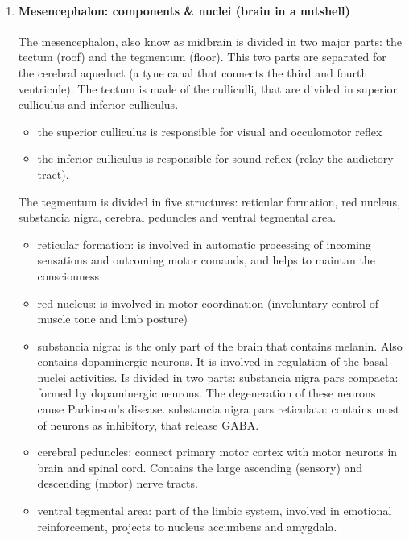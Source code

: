 \documentclass[12pt,article,oneside,a4paper]{memoir}
\begin{document}
\begin{enumerate}
\item \paragraph{Mesencephalon: components \& nuclei (brain in a nutshell)}\label{question:mesencephalon}
The mesencephalon, also know as midbrain is divided in two major parts: the tectum (roof) and the tegmentum (floor). This two parts are separated for the cerebral aqueduct (a tyne canal that connects the third and fourth ventricule).
The tectum is made of the culliculli, that are divided in superior culliculus and inferior culliculus.
\begin{itemize}
\item the superior culliculus is responsible for visual and occulomotor reflex 
\item the inferior culliculus is responsible for sound reflex (relay the audictory tract).
\end{itemize}
The tegmentum is divided in five structures: reticular formation, red nucleus, substancia nigra, cerebral peduncles and ventral tegmental area.
\begin{itemize}
\item reticular formation: is involved in automatic processing of incoming sensations and outcoming motor comands, and helps to maintan the consciouness
\item red nucleus: is involved in motor coordination (involuntary control of muscle tone and limb posture)
\item substancia nigra: is the only part of the brain that contains melanin. Also contains dopaminergic neurons. It is involved in regulation of the basal nuclei activities. Is divided in two parts:
\subitem substancia nigra pars compacta: formed by dopaminergic neurons. The degeneration of these neurons cause Parkinson's disease.
\subitem substancia nigra pars reticulata: contains most of neurons as inhibitory, that release GABA. 
\item cerebral peduncles: connect primary motor cortex with motor neurons in brain and spinal cord. Contains the large ascending (sensory) and descending (motor) nerve tracts.
\item ventral tegmental area: part of the limbic system, involved in emotional reinforcement, projects to nucleus accumbens and amygdala.
\end{itemize}


\end{enumerate}
\end{document}
